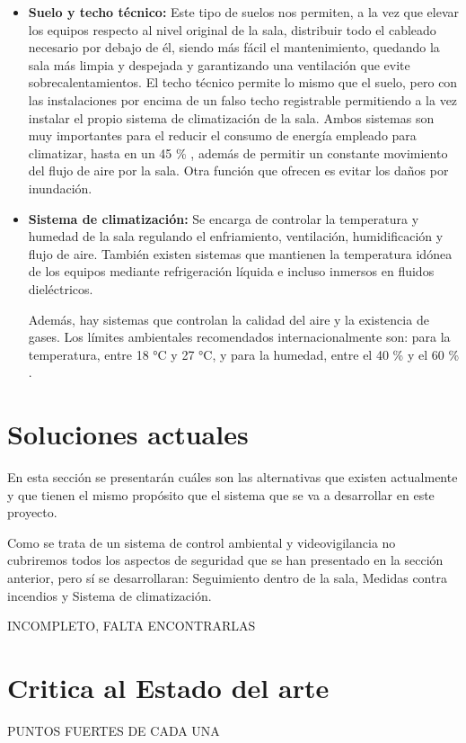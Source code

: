 \begin{itemize}
	\item \textbf{Suelo y techo técnico:} Este tipo de suelos nos permiten, a la vez que elevar los equipos respecto al nivel original de la sala, distribuir todo el cableado necesario por debajo de él, siendo más fácil el mantenimiento, quedando la sala más limpia y despejada y garantizando una ventilación que evite sobrecalentamientos. El techo técnico permite lo mismo que el suelo, pero con las instalaciones por encima de un falso techo registrable permitiendo a la vez instalar el propio sistema de climatización de la sala. Ambos sistemas son muy importantes para el reducir el consumo de energía empleado para climatizar, hasta en un 45 \% \cite{noauthor_suelo_2020}, además de permitir un constante movimiento del flujo de aire por la sala. Otra función que ofrecen es evitar los daños por inundación.
	\item \textbf{Sistema de climatización:} Se encarga de controlar la temperatura y humedad de la sala regulando el enfriamiento, ventilación, humidificación y flujo de aire. También existen sistemas que mantienen la temperatura idónea de los equipos mediante refrigeración líquida e incluso inmersos en fluidos dieléctricos.
	
	Además, hay sistemas que controlan la calidad del aire y la existencia de gases. Los límites ambientales recomendados internacionalmente son: para la temperatura, entre 18 °C y 27 °C, y para la humedad, entre el 40 \% y el 60 \% \cite{noauthor_recommended_nodate}.
\end{itemize}

\section{Soluciones actuales}
En esta sección se presentarán cuáles son las alternativas que existen actualmente y que tienen el mismo propósito que el sistema que se va a desarrollar en este proyecto.

Como se trata de un sistema de control ambiental y videovigilancia no cubriremos todos los aspectos de seguridad que se han presentado en la sección anterior, pero sí se desarrollaran: Seguimiento dentro de la sala, Medidas contra incendios y Sistema de climatización.

INCOMPLETO, FALTA ENCONTRARLAS

\section{Critica al Estado del arte}
PUNTOS FUERTES DE CADA UNA

